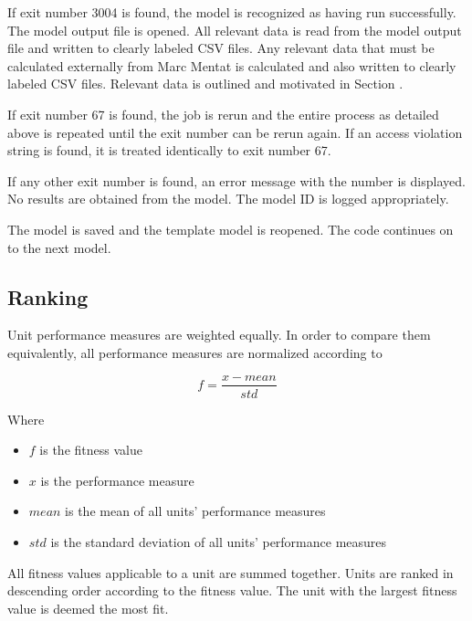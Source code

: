 If exit number 3004 is found, the model is recognized as having run successfully. The model output file is opened. All relevant data is read from the model output file and written to clearly labeled CSV files. Any relevant data that must be calculated externally from Marc Mentat is calculated and also written to clearly labeled CSV files. Relevant data is outlined and motivated in Section .

If exit number 67 is found, the job is rerun and the entire process as detailed above is repeated until the exit number can be rerun again. If an access violation string is found, it is treated identically to exit number 67.

If any other exit number is found, an error message with the number is displayed. No results are obtained from the model. The model ID is logged appropriately.

The model is saved and the template model is reopened. The code continues on to the next model.

\subsection{Ranking}
\label{ssec:rank}

Unit performance measures are weighted equally. In order to compare them equivalently, all performance measures are normalized according to

\begin{equation}
	f=\frac{x-mean}{std}
\end{equation}

Where

\begin{itemize}
	\item $f$ is the fitness value
	\item $x$ is the performance measure
	\item $mean$ is the mean of all units' performance measures
	\item $std$ is the standard deviation of all units' performance measures
\end{itemize}

All fitness values applicable to a unit are summed together. Units are ranked in descending order according to the fitness value. The unit with the largest fitness value is deemed the most fit.